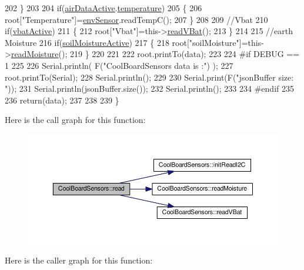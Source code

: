 \begin{DoxyCode}
202     \}   
203     
204     \textcolor{keywordflow}{if}(\hyperlink{classCoolBoardSensors_abff8dfeccb2f7689847bb64d5f1cd31e}{airDataActive}.\hyperlink{structCoolBoardSensors_1_1airActive_a9a6633c426b0508e30ebc1832ec6d745}{temperature})
205     \{
206         root[\textcolor{stringliteral}{"Temperature"}]=\hyperlink{classCoolBoardSensors_a868e38985e9a2412829fa2790ca13e2e}{envSensor}.readTempC();
207     \}
208     
209     \textcolor{comment}{//Vbat}
210     \textcolor{keywordflow}{if}(\hyperlink{classCoolBoardSensors_af5039ad760b0ff0aa7eee16c55e81702}{vbatActive})    
211     \{   
212         root[\textcolor{stringliteral}{"Vbat"}]=this->\hyperlink{classCoolBoardSensors_a6944b6ea7bce8e2fce1b434acfd9d5f3}{readVBat}();
213     \}
214     
215     \textcolor{comment}{//earth Moisture}
216     \textcolor{keywordflow}{if}(\hyperlink{classCoolBoardSensors_a31983eecc0f9cd000e1f912206ea4dc8}{soilMoistureActive})
217     \{   
218         root[\textcolor{stringliteral}{"soilMoisture"}]=this->\hyperlink{classCoolBoardSensors_a8761bff50373c485f4465c8db47d0633}{readMoisture}();
219     \}
220     
221     
222     root.printTo(data);
223 
224 \textcolor{preprocessor}{#if DEBUG == 1}
225 
226     Serial.println( F(\textcolor{stringliteral}{"CoolBoardSensors data is :"}) );
227     root.printTo(Serial);
228     Serial.println();
229     
230     Serial.print(F(\textcolor{stringliteral}{"jsonBuffer size: "}));
231     Serial.println(jsonBuffer.size());
232     Serial.println();
233 
234 \textcolor{preprocessor}{#endif}
235 
236     \textcolor{keywordflow}{return}(data);   
237     
238 
239 \}
\end{DoxyCode}
Here is the call graph for this function\+:
\nopagebreak
\begin{figure}[H]
\begin{center}
\leavevmode
\includegraphics[width=350pt]{classCoolBoardSensors_a91badb2539d91fda8679f2a597874c48_cgraph}
\end{center}
\end{figure}
Here is the caller graph for this function\+:
